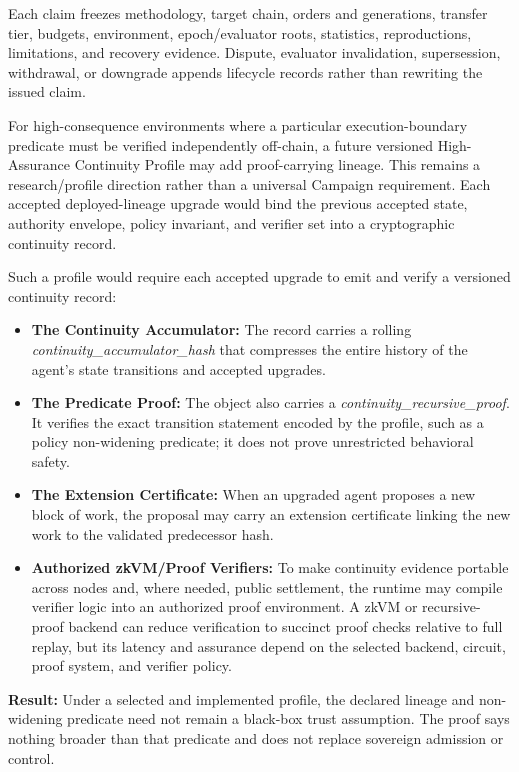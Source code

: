 \documentclass[
  11pt,
]{article}
\providecommand{\tightlist}{%
  \setlength{\itemsep}{0pt}\setlength{\parskip}{0pt}}
\begin{document}
Each claim freezes methodology, target chain, orders and generations, transfer
tier, budgets, environment, epoch/evaluator roots, statistics, reproductions,
limitations, and recovery evidence. Dispute, evaluator invalidation,
supersession, withdrawal, or downgrade appends lifecycle records rather than
rewriting the issued claim.

For high-consequence environments where a particular execution-boundary
predicate must be verified independently off-chain, a future versioned
High-Assurance Continuity Profile may add proof-carrying lineage. This remains
a research/profile direction rather than a universal Campaign requirement.
Each accepted deployed-lineage upgrade would bind the previous accepted state,
authority envelope, policy invariant, and verifier set into a cryptographic
continuity record.

Such a profile would require each accepted upgrade to emit and verify a
versioned continuity record:

\begin{itemize}
\tightlist
\item
  \textbf{The Continuity Accumulator:} The record carries a rolling
  \emph{continuity\_accumulator\_hash} that compresses the entire
  history of the agent's state transitions and accepted upgrades.
\item
  \textbf{The Predicate Proof:} The object also carries a
  \emph{continuity\_recursive\_proof}. It verifies the exact transition
  statement encoded by the profile, such as a policy non-widening predicate;
  it does not prove unrestricted behavioral safety.
\item
  \textbf{The Extension Certificate:} When an upgraded agent proposes a
  new block of work, the proposal may carry an extension certificate linking
  the new work to the validated predecessor hash.
\item
  \textbf{Authorized zkVM/Proof Verifiers:} To make continuity evidence
  portable across nodes and, where needed, public settlement, the runtime
  may compile verifier logic into an authorized proof environment. A
  zkVM or recursive-proof backend can reduce verification to succinct
  proof checks relative to full replay, but its latency and assurance
  depend on the selected backend, circuit, proof system, and verifier
  policy.
\end{itemize}

\textbf{Result:} Under a selected and implemented profile, the declared
lineage and non-widening predicate need not remain a black-box trust
assumption. The proof says nothing broader than that predicate and does not
replace sovereign admission or control.
\end{document}
